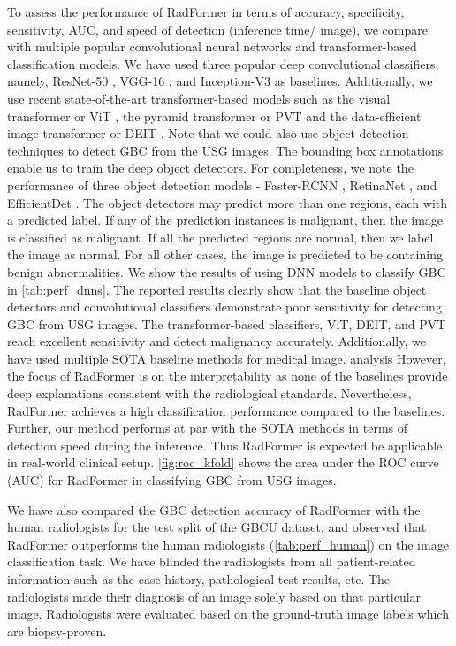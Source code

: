 \documentclass[twocolumn,final]{elsarticle}
\def\myarch{RadFormer\xspace}
\begin{document}
To assess the performance of \myarch in terms of accuracy, specificity, sensitivity, AUC, and speed of detection (inference time/ image), we compare with multiple popular convolutional neural networks and transformer-based classification models. We have used three popular deep convolutional classifiers, namely, ResNet-50 \citep{resnet}, VGG-16 \citep{vgg}, and Inception-V3 \citep{inception} as baselines. Additionally, we use recent state-of-the-art transformer-based models such as the visual transformer or ViT \citep{dosovitskiy2020image}, the pyramid transformer or PVT \citep{wang2021pvtv2} and the data-efficient image transformer or DEIT \citep{touvron2021training}. Note that we could also use object detection techniques to detect GBC from the USG images. The bounding box annotations enable us to train the deep object detectors. For completeness, we note the performance of three object detection models - Faster-RCNN \citep{fasterrcnn}, RetinaNet \citep{retinanet}, and EfficientDet \citep{efficientdet}. The object detectors may predict more than one regions, each with a predicted label. If any of the prediction instances is malignant, then the image is classified as malignant. If all the predicted regions are normal, then we label the image as normal. For all other cases, the image is predicted to be containing benign abnormalities. We show the results of using DNN models to classify GBC in \cref{tab:perf_dnns}. The reported results clearly show that the baseline object detectors and convolutional classifiers demonstrate poor sensitivity for detecting GBC from USG images. The transformer-based classifiers, ViT, DEIT, and PVT reach excellent sensitivity and detect malignancy accurately. Additionally, we have used multiple SOTA baseline methods for medical image.  analysis However, the focus of \myarch is on the interpretability as none of the baselines provide deep explanations consistent with the radiological standards. Nevertheless, \myarch achieves a high classification performance compared to the baselines. Further, our method performs at par with the SOTA methods in terms of detection speed during the inference. Thus \myarch is expected be applicable in real-world clinical setup. \cref{fig:roc_kfold} shows the area under the ROC curve (AUC) for \myarch in classifying GBC from USG images. 
\par We have also compared the GBC detection accuracy of \myarch with the human radiologists for the test split of the GBCU dataset, and observed that \myarch outperforms the human radiologists (\cref{tab:perf_human}) on the image classification task. We have blinded the radiologists from all patient-related information such as the case history, pathological test results, etc. The radiologists made their diagnosis of an image solely based on that particular image. Radiologists were evaluated based on the ground-truth image labels which are biopsy-proven.
\end{document}

